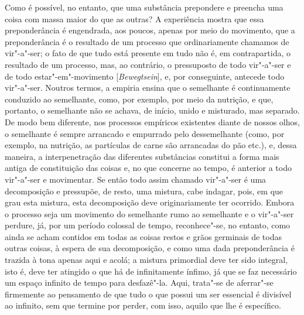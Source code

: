 Como é possível, no entanto, que uma substância prepondere e preencha
uma coisa com massa maior do que as outras? A experiência mostra que
essa preponderância é engendrada, aos poucos, apenas por meio do
movimento, que a preponderância é o resultado de um processo que
ordinariamente chamamos de vir"-a"-ser; o fato de que tudo está presente
em tudo não é, em contrapartida, o resultado de um processo, mas, ao
contrário, o pressuposto de todo vir"-a"-ser e de todo estar"-em"-movimento
[\textit{Bewegtsein}], e, por conseguinte, antecede todo vir"-a"-ser.
Noutros termos, a empiria ensina que o semelhante é continuamente
conduzido ao semelhante, como, por exemplo, por meio da nutrição, e
que, portanto, o semelhante não se achava, de início, unido e
misturado, mas separado. De modo bem diferente, nos processos
empíricos existentes diante de nossos olhos, o semelhante é sempre
arrancado e empurrado pelo dessemelhante (como, por exemplo, na
nutrição, as partículas de carne são arrancadas do pão etc.), e, dessa
maneira, a interpenetração das diferentes substâncias constitui a forma
mais antiga de constituição das coisas e, no que concerne ao tempo, é
anterior a todo vir"-a"-ser e movimentar. Se então todo assim chamado
vir"-a"-ser é uma decomposição e pressupõe, de resto, uma mistura, cabe
indagar, pois, em que grau esta mistura, esta decomposição deve
originariamente ter ocorrido. Embora o processo seja um movimento do
semelhante rumo ao semelhante e o vir"-a"-ser perdure, já, por um período
colossal de tempo, reconhece"-se, no entanto, como ainda se acham
contidos em todas as coisas restos e grãos germinais de todas outras
coisas, à espera de sua decomposição, e como uma dada preponderância é
trazida à tona apenas aqui e acolá; a mistura primordial deve ter sido
integral, isto é, deve ter atingido o que há de infinitamente ínfimo,
já que se faz necessário um espaço infinito de tempo para desfazê"-la.
Aqui, trata"-se de aferrar"-se firmemente ao pensamento de que tudo o que
possui um ser essencial é divisível ao infinito, sem que termine por
perder, com isso, aquilo que lhe é específico.

